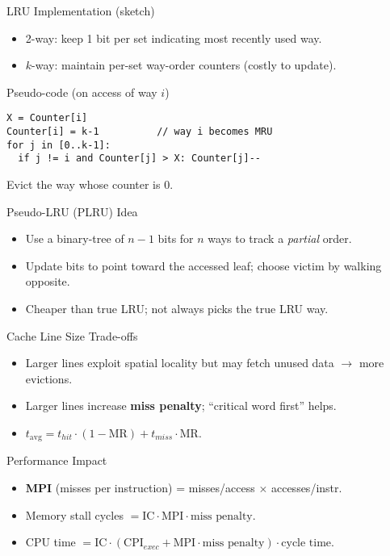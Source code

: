 \documentclass[aspectratio=169,12pt]{beamer}
\begin{document}
\begin{frame}[fragile]{LRU Implementation (sketch)}
\begin{itemize}
  \item 2-way: keep 1 bit per set indicating most recently used way.
  \item $k$-way: maintain per-set way-order counters (costly to update).
\end{itemize}
\begin{block}{Pseudo-code (on access of way $i$)}
\begin{lstlisting}[basicstyle=\ttfamily\small]
X = Counter[i]
Counter[i] = k-1          // way i becomes MRU
for j in [0..k-1]:
  if j != i and Counter[j] > X: Counter[j]--
\end{lstlisting}
Evict the way whose counter is 0.
\end{block}
\end{frame}

\begin{frame}{Pseudo-LRU (PLRU) Idea}
\begin{itemize}
  \item Use a binary-tree of $n-1$ bits for $n$ ways to track a \emph{partial} order.
  \item Update bits to point toward the accessed leaf; choose victim by walking opposite.
  \item Cheaper than true LRU; not always picks the true LRU way.
\end{itemize}
\end{frame}

\begin{frame}{Cache Line Size Trade-offs}
\begin{itemize}
  \item Larger lines exploit spatial locality but may fetch unused data $\rightarrow$ more evictions.
  \item Larger lines increase \textbf{miss penalty}; ``critical word first'' helps.
  \item $t_{\text{avg}} = t_{hit}\cdot(1-\text{MR}) + t_{miss}\cdot \text{MR}$.
\end{itemize}
\end{frame}

\begin{frame}{Performance Impact}
\begin{itemize}
  \item \textbf{MPI} (misses per instruction) = misses/access $\times$ accesses/instr.
  \item Memory stall cycles $= \text{IC}\cdot \text{MPI}\cdot \text{miss penalty}$.
  \item CPU time $= \text{IC}\cdot(\text{CPI}_{exec}+\text{MPI}\cdot \text{miss penalty})\cdot \text{cycle time}$.
\end{itemize}
\end{frame}
\end{document}
